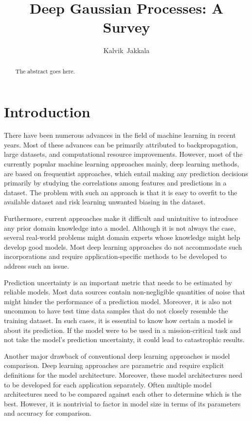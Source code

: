 \documentclass[letterpaper,11pt]{extarticle}
\title{Deep Gaussian Processes: A Survey}
\begin{document}
\author{Kalvik~Jakkala}

\maketitle

\begin{abstract}
The abstract goes here.
\end{abstract}


\section{Introduction}
There have been numerous advances in the field of machine learning in recent years. Most of these advances can be primarily attributed to backpropagation, large datasets, and computational resource improvements. However, most of the currently popular machine learning approaches mainly, deep learning methods, are based on frequentist approaches, which entail making any prediction decisions primarily by studying the correlations among features and predictions in a dataset. The problem with such an approach is that it is easy to overfit to the available dataset and risk learning unwanted biasing in the dataset. 

Furthermore, current approaches make it difficult and unintuitive to introduce any prior domain knowledge into a model. Although it is not always the case, several real-world problems might domain experts whose knowledge might help develop good models. Most deep learning approaches do not accommodate such incorporations and require application-specific methods to be developed to address such an issue.

Prediction uncertainty is an important metric that needs to be estimated by reliable models. Most data sources contain non-negligible quantities of noise that might hinder the performance of a prediction model. Moreover, it is also not uncommon to have test time data samples that do not closely resemble the training dataset. In such cases, it is essential to know how certain a model is about its prediction. If the model were to be used in a mission-critical task and not take the model's prediction uncertainty, it could lead to catastrophic results. 

Another major drawback of conventional deep learning approaches is model comparison. Deep learning approaches are parametric and require explicit definitions for the model architecture. Moreover, these model architectures need to be developed for each application separately. Often multiple model architectures need to be compared against each other to determine which is the best. However, it is nontrivial to factor in model size in terms of its parameters and accuracy for comparison. 
\end{document}
